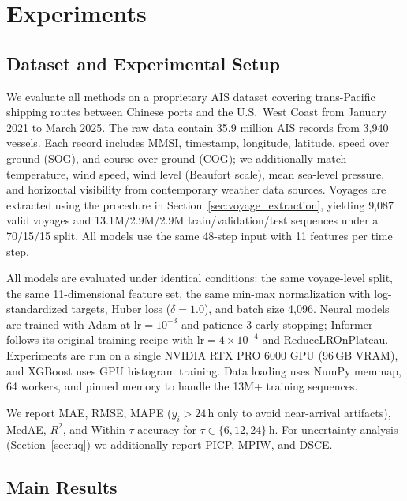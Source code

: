 \documentclass[sigconf,anonymous]{acmart}%
\begin{document}
\section{Experiments}

\subsection{Dataset and Experimental Setup}

We evaluate all methods on a proprietary AIS dataset covering trans-Pacific shipping routes between Chinese ports and the U.S.\ West Coast from January 2021 to March 2025. The raw data contain 35.9 million AIS records from 3,940 vessels. Each record includes MMSI, timestamp, longitude, latitude, speed over ground (SOG), and course over ground (COG); we additionally match temperature, wind speed, wind level (Beaufort scale), mean sea-level pressure, and horizontal visibility from contemporary weather data sources. Voyages are extracted using the procedure in Section~\ref{sec:voyage_extraction}, yielding 9,087 valid voyages and 13.1M/2.9M/2.9M train/validation/test sequences under a 70/15/15 split. All models use the same 48-step input with 11 features per time step.

All models are evaluated under identical conditions: the same voyage-level split, the same 11-dimensional feature set, the same min-max normalization with log-standardized targets, Huber loss ($\delta = 1.0$), and batch size 4,096. Neural models are trained with Adam at $\mathrm{lr}=10^{-3}$ and patience-3 early stopping; Informer follows its original training recipe with $\mathrm{lr}=4\times 10^{-4}$ and ReduceLROnPlateau. Experiments are run on a single NVIDIA RTX PRO 6000 GPU (96\,GB VRAM), and XGBoost uses GPU histogram training. Data loading uses NumPy memmap, 64 workers, and pinned memory to handle the 13M+ training sequences.

We report MAE, RMSE, MAPE ($y_i{>}24$\,h only to avoid near-arrival artifacts), MedAE, $R^2$, and Within-$\tau$ accuracy for $\tau{\in}\{6,12,24\}$\,h. For uncertainty analysis (Section~\ref{sec:uq}) we additionally report PICP, MPIW, and DSCE.


\subsection{Main Results}
\end{document}
